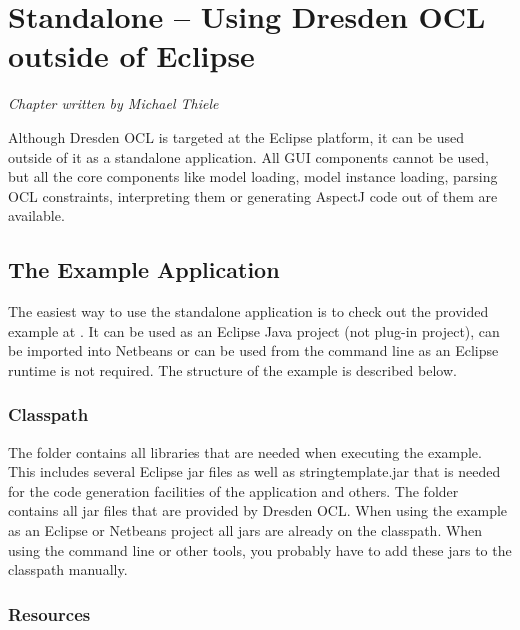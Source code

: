 \chapter{Standalone -- Using Dresden OCL outside of Eclipse}
\label{chapter:standalone}
\lstset{language=Java}

\begin{flushright}
\textit{Chapter written by Michael Thiele}
\end{flushright}

Although Dresden OCL is targeted at the Eclipse platform, it can be used outside
of it as a standalone application. All GUI components cannot be used, but all 
the core components like model loading, model instance loading, parsing OCL 
constraints, interpreting them or generating AspectJ code out of them are 
available.


\section{The Example Application}

The easiest way to use the standalone application is to check out the provided 
example at 
. It can be used as an Eclipse Java project (not plug-in project), can be imported
into Netbeans or can be used from the command line as an Eclipse runtime is not 
required. The structure of the example is described below.


\subsection{Classpath}

The  folder contains all libraries that are needed when executing
the example. This includes several Eclipse jar files as well as
stringtemplate.jar that is needed for the code generation facilities of the 
application and others. The  folder contains all jar files
that are provided by Dresden OCL. When using the example as an Eclipse or
Netbeans project all jars are already on the classpath. When using the command
line or other tools, you probably have to add these jars to the classpath manually.


\subsection{Resources}

